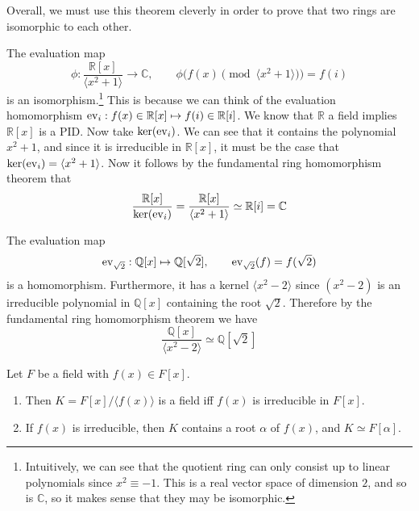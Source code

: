   Overall, we must use this theorem cleverly in order to prove that two rings are isomorphic to each other. 

  \begin{example}
    The evaluation map 
    \begin{equation}
      \phi: \frac{\mathbb{R}[x]}{\langle x^2 + 1 \rangle} \rightarrow \mathbb{C}, \qquad \phi\big( f(x) \pmod{\langle x^2 + 1 \rangle} \big) = f(i)
    \end{equation}
    is an isomorphism.\footnote{Intuitively, we can see that the quotient ring can only consist up to linear polynomials since $x^2 \equiv -1$. This is a real vector space of dimension $2$, and so is $\mathbb{C}$, so it makes sense that they may be isomorphic. } This is because we can think of the evaluation homomorphism $\ev_i : f(x) \in \mathbb{R}[x] \mapsto f(i) \in \mathbb{R}[i]$. We know that $\mathbb{R}$ a field implies $\mathbb{R}[x]$ is a PID. Now take $\ker(\ev_i)$. We can see that it contains the polynomial $x^2 + 1$, and since it is irreducible in $\mathbb{R}[x]$, it must be the case that $\ker(\ev_i) = \langle x^2 + 1 \rangle$. Now it follows by the fundamental ring homomorphism theorem that 
    \begin{equation}
      \frac{\mathbb{R}[x]}{\ker(\ev_i)} = \frac{\mathbb{R}[x]}{\langle x^2 + 1 \rangle} \simeq \mathbb{R}[i] = \mathbb{C}
    \end{equation}
  \end{example} 

  \begin{example}
    The evaluation map 
    \begin{equation}
      \ev_{\sqrt{2}}: \mathbb{Q}[x] \mapsto \mathbb{Q}[\sqrt{2}], \qquad \ev_{\sqrt{2}} (f) = f(\sqrt{2}) 
    \end{equation}
    is a homomorphism. Furthermore, it has a kernel $\langle x^2 - 2 \rangle$ since $(x^2 - 2)$ is an irreducible polynomial in $\mathbb{Q}[x]$ containing the root $\sqrt{2}$. Therefore by the fundamental ring homomorphism theorem we have 
    \begin{equation}
      \frac{\mathbb{Q}[x]}{\langle x^2 - 2 \rangle} \simeq \mathbb{Q}[\sqrt{2}]
    \end{equation}
  \end{example} 

  \begin{theorem}
    Let $F$ be a field with $f(x) \in F[x]$. 
    \begin{enumerate}
      \item Then $K = F[x] / \langle f(x) \rangle$ is a field iff $f(x)$ is irreducible in $F[x]$. 
      \item If $f(x)$ is irreducible, then $K$ contains a root $\alpha$ of $f(x)$, and $K \simeq F[\alpha]$. 
    \end{enumerate}
  \end{theorem}

